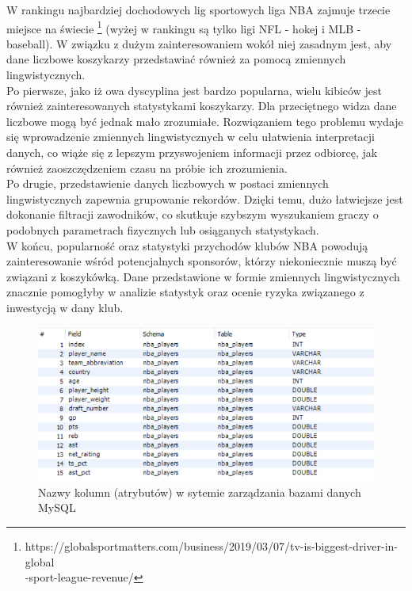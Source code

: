 \documentclass{classrep}
\begin{document}
 W rankingu najbardziej dochodowych lig sportowych liga NBA zajmuje trzecie miejsce na świecie 
 \footnote {https://globalsportmatters.com/business/2019/03/07/tv-is-biggest-driver-in-global\\-sport-league-revenue/}
(wyżej w rankingu są tylko ligi NFL - hokej i MLB - baseball). W związku z dużym zainteresowaniem wokół niej zasadnym jest, aby dane liczbowe koszykarzy przedstawiać również za pomocą zmiennych lingwistycznych. \\
 \indent Po pierwsze, jako iż owa dyscyplina jest bardzo popularna, wielu kibiców jest również zainteresowanych statystykami koszykarzy. Dla przeciętnego widza dane liczbowe mogą być jednak mało zrozumiałe. Rozwiązaniem tego problemu wydaje się wprowadzenie zmiennych lingwistycznych w celu ułatwienia interpretacji danych, co wiąże się z lepszym przyswojeniem informacji przez odbiorcę, jak również zaoszczędzeniem czasu na próbie ich zrozumienia. \\
 \indent Po drugie, przedstawienie danych liczbowych w postaci zmiennych lingwistycznych zapewnia grupowanie rekordów. Dzięki temu, dużo łatwiejsze jest dokonanie filtracji zawodników, co skutkuje szybszym wyszukaniem graczy o podobnych parametrach fizycznych lub osiąganych statystykach.\\
 \indent W końcu, popularność oraz statystyki przychodów klubów NBA powodują zainteresowanie wśród potencjalnych sponsorów, którzy niekoniecznie muszą być związani z koszykówką. Dane przedstawione w formie zmiennych lingwistycznych znacznie pomogłyby w analizie statystyk oraz ocenie ryzyka związanego z inwestycją w dany klub. 
 \begin{figure}[H]
    \centering
    \includegraphics[width=14cm]{mysql_tables.png}
    \caption{Nazwy kolumn (atrybutów) w sytemie zarządzania bazami danych MySQL}
    \label{rysunek:podzbiory}
\end{figure}
\end{document}
